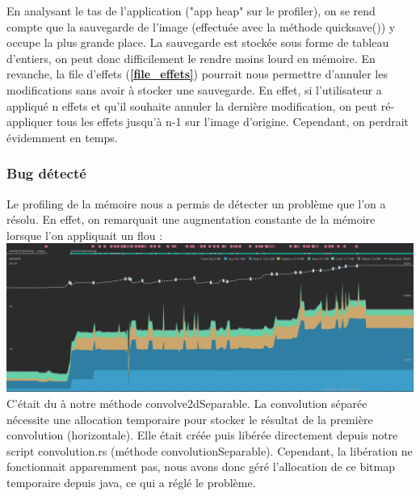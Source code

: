 En analysant le tas de l'application ("app heap" sur le profiler), on se rend compte que la sauvegarde de l'image (effectuée avec la méthode quicksave()) y occupe la plus grande place. La sauvegarde est stockée sous forme de tableau d'entiers, on peut donc difficilement le rendre moins lourd en mémoire. En revanche, la file d'effets (\textbf{\ref{file_effets}}) pourrait nous permettre d'annuler les modifications sans avoir à stocker une sauvegarde. En effet, si l'utilisateur a appliqué n effets et qu'il souhaite annuler la dernière modification, on peut ré-appliquer tous les effets jusqu'à n-1 sur l'image d'origine. Cependant, on perdrait évidemment en temps.

\newpage

\subsubsection*{Bug détecté}

Le profiling de la mémoire nous a permis de détecter un problème que l'on a résolu. En effet, on remarquait une augmentation constante de la mémoire lorsque l'on appliquait un flou :
\\

\includegraphics[width=1\textwidth]{report_src/memory/3400x2118_with_bug.PNG}
\\

C'était du à notre méthode convolve2dSeparable. La convolution séparée nécessite une allocation temporaire pour stocker le résultat de la première convolution (horizontale). 
Elle était créée puis libérée directement depuis notre script convolution.rs (méthode convolutionSeparable). Cependant, la libération ne fonctionnait apparemment pas, nous avons donc géré l'allocation de ce bitmap temporaire depuis java, ce qui a réglé le problème.
